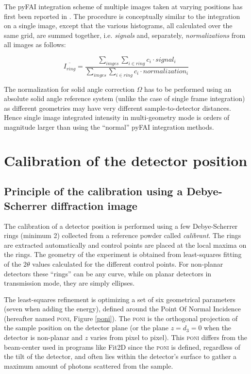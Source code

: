 \documentclass[preprint]{iucr}              %
\begin{document}
The pyFAI integration scheme of multiple images taken at varying positions has
first been reported in  \cite{PyFAI_PDJ}. 
The procedure is conceptually similar to the integration on a single image,
except that the various histograms, all calculated over the same
grid, are summed together, i.e. \textit{signals} and, separately, 
\textit{normalizations} from all images as follows: 

\begin{equation}
\overline{I_{ring}} = \frac{\sum\limits_{imges} \sum\limits_{i \in ring} c_i \cdot
signal_i} {\sum\limits_{imges} \sum\limits_{i \in ring} c_i \cdot
normalization_i} 
\end{equation}

The normalization for solid angle correction $\Omega$ has to be performed
using an absolute solid angle reference system (unlike the case of single
frame integration) as different geometries may have very different
sample-to-detector distances.
Hence single image integrated intensity in multi-geometry mode is orders of
magnitude larger than using the ``normal'' pyFAI integration methods.

\section{Calibration of the detector position}

\subsection{Principle of the calibration using a Debye-Scherrer diffraction
image}
The calibration of a detector position is performed using a few Debye-Scherrer
rings (minimum 2) collected from a reference powder called \textit{calibrant}.
The rings are extracted automatically and control points are placed at the
local maxima on the rings.
The geometry of the experiment is obtained from least-squares fitting of
the $2\theta$ values calculated for the different control points.
For non-planar detectors these ``rings'' can be any curve, while on planar 
detectors in transmission mode, they are simply ellipses.


The least-squares refinement is optimizing a set of six geometrical parameters
(seven when adding the energy), defined around the Point Of Normal Incidence 
(hereafter named \textsc{poni}, Figure \ref{poni}).
The \textsc{poni} is
the orthogonal projection of the sample position on the detector plane (or
the plane $z=d_3=0$ when the detector is non-planar and $z$ varies from pixel to pixel).
This \textsc{poni} differs from the beam-center used in programs like
Fit2D \cite{Hammersley:fs5107} since the \textsc{poni} is defined, 
regardless of the tilt of the detector, and often lies
within the detector's surface to gather a maximum amount of photons scattered from the sample.
\end{document}
